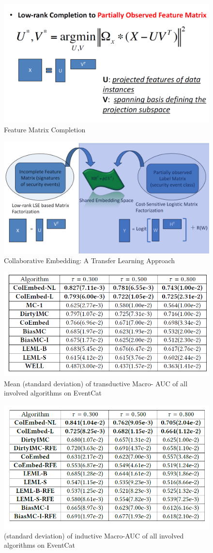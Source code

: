 \documentclass[conference]{IEEEtran}
\begin{document}
\begin{figure}
\centerline{\includegraphics[width=\textwidth,width=9cm]{figura13.png}}
\caption{Feature Matrix Completion}
\label{fig}
\end{figure}

\begin{figure}
\centerline{\includegraphics[width=\textwidth,width=9cm]{figura14.png}}
\caption{Collaborative Embedding: A Transfer Learning Approach}
\label{fig}
\end{figure}


\begin{figure}
\centerline{\includegraphics[width=\textwidth,width=9cm]{figura15.png}}
\caption{Mean (standard deviation) of transductive Macro-
AUC of all involved algorithms on EventCat}
\label{fig}
\end{figure}

\begin{figure}
\centerline{\includegraphics[width=\textwidth,width=9cm]{figura16.png}}
\caption {(standard deviation) of inductive Macro-AUC of all involved algorithms on EventCat}
\label{fig}
\end{figure}
\end{document}
